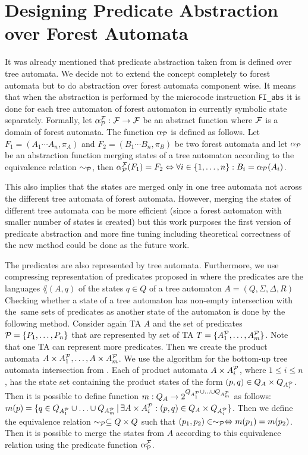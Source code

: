 \section{Designing Predicate Abstraction over Forest Automata}
\label{sec:padesign}

It was already mentioned that predicate abstraction taken from \cite{artmc}
is defined over tree automata.
We decide not to extend the concept completely to forest automata but
to do abstraction over forest automata component wise.
It means that when the abstraction is performed by the microcode instruction
{\tt FI\_abs} it is done for each tree automaton of forest automaton in currently symbolic
state separately.
Formally, let $\alpha_{\mathcal{P}}^{\mathcal{F}}: \mathcal{F} \rightarrow \mathcal{F}$ be an abstract function where
$\mathcal{F}$ is a domain of forest automata.
The function $\alpha_{\mathcal{P}}$ is defined as follows.
Let $F_1=(A_1 \cdots A_n, \pi_A)$ and $F_2=(B_1 \cdots B_n, \pi_B)$ be two forest automata
and let $\alpha_{\mathcal{P}}$ be an abstraction function merging states of a tree automaton according
to the equivalence relation $\sim_{\mathcal{P}}$,
then $\alpha_{\mathcal{P}}^{\mathcal{F}}(F_1) = F_2 \Leftrightarrow \forall i \in \{1,\ldots,n\}: B_i = \alpha_{\mathcal{P}}(A_i)$.

This also implies that the states are merged only in one tree automata not across the different
tree automata of forest automata.
However, merging the states of different tree automata can be more efficient (since
a forest automaton with smaller number of states is created) but this
work purposes the first version of predicate abstraction and more
fine tuning including theoretical correctness of the new method could
be done as the future work.

The predicates are also represented by tree automata.
Furthermore, we use compressing representation of predicates
proposed in \cite{artmc} where the predicates are the languages $\lang(A,q)$
of the states $q \in Q$ of a tree automaton $A=(Q,\Sigma,\Delta, R)$
Checking whether a state of a tree automaton has non-empty intersection
with the~same sets of predicates as another state of the automaton is done by the following method.
Consider again TA $A$ and the set of predicates $\mathcal{P} = \{P_1, \ldots, P_n\}$
that are represented by set of TA $T=\{A^\mathcal{P}_{1}, \ldots, A^\mathcal{P}_{m}\}$.
Note that one TA can represent more predicates.
Then we create the product automata $A \times A^\mathcal{P}_{1}, \ldots, A \times A^\mathcal{P}_{m}$.
We use the algorithm for the bottom-up tree automata intersection from \cite{mt:lengal}.
Each of product automata $A \times A^\mathcal{P}_{i}$, where $1 \leq i \leq n$, has the state set
containing the product states of the form $(p,q) \in Q_A \times Q_{A^\mathcal{P}_{i}}$.
Then it is possible to define function $m: Q_A \rightarrow 2^{Q_{A^\mathcal{P}_{1}} \cup \ldots
\cup Q_{A^\mathcal{P}_{m}}}$ as follows: $m(p) = \{q \in Q_{A^\mathcal{P}_{1}} \cup \ldots \cup Q_{A^\mathcal{P}_{m}}\,|\,
\exists A \times A^\mathcal{P}_{i}: (p,q) \in Q_{A} \times Q_{A^\mathcal{P}_{i}}\}$.
Then we define the equivalence relation $\sim_{\mathcal{P}} \subseteq Q \times Q$
such that $(p_1,p_2) \in \sim_{\mathcal{P}} \Leftrightarrow m(p_1) = m(p_2)$.
Then it is possible to merge the states from $A$ according to this equivalence relation
using the predicate function $\alpha_{\mathcal{P}}^{\mathcal{F}}$.

